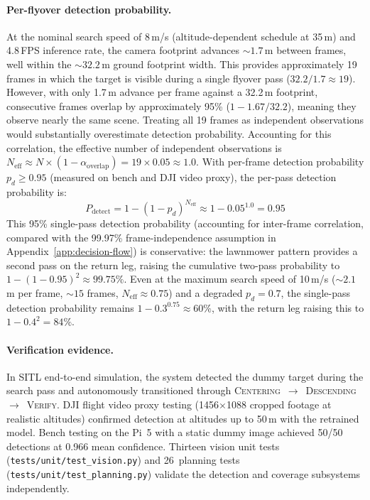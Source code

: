 \paragraph{Per-flyover detection probability.} At the nominal search speed of 8\,m/s (altitude-dependent schedule at 35\,m) and 4.8\,FPS inference rate, the camera footprint advances ${\sim}1.7$\,m between frames, well within the ${\sim}32.2$\,m ground footprint width. This provides approximately 19 frames in which the target is visible during a single flyover pass ($32.2 / 1.7 \approx 19$). However, with only 1.7\,m advance per frame against a 32.2\,m footprint, consecutive frames overlap by approximately 95\% ($1 - 1.67/32.2$), meaning they observe nearly the same scene. Treating all 19 frames as independent observations would substantially overestimate detection probability. Accounting for this correlation, the effective number of independent observations is $N_{\text{eff}} \approx N \times (1 - \alpha_{\text{overlap}}) = 19 \times 0.05 \approx 1.0$. With per-frame detection probability $p_d \geq 0.95$ (measured on bench and DJI video proxy), the per-pass detection probability is:
\[
    P_{\text{detect}} = 1 - (1 - p_d)^{N_{\text{eff}}} \approx 1 - 0.05^{1.0} = 0.95
\]
This 95\% single-pass detection probability (accounting for inter-frame correlation, compared with the 99.97\% frame-independence assumption in Appendix~\ref{app:decision-flow}) is conservative: the lawnmower pattern provides a second pass on the return leg, raising the cumulative two-pass probability to $1 - (1 - 0.95)^2 \approx 99.75\%$. Even at the maximum search speed of 10\,m/s (${\sim}2.1$\,m per frame, ${\sim}15$ frames, $N_{\text{eff}} \approx 0.75$) and a degraded $p_d = 0.7$, the single-pass detection probability remains $1 - 0.3^{0.75} \approx 60\%$, with the return leg raising this to $1 - 0.4^2 = 84\%$.

\paragraph{Verification evidence.} In SITL end-to-end simulation, the system detected the dummy target during the search pass and autonomously transitioned through \textsc{Centering}~$\rightarrow$~\textsc{Descending}~$\rightarrow$~\textsc{Verify}. DJI flight video proxy testing (1456$\times$1088 cropped footage at realistic altitudes) confirmed detection at altitudes up to 50\,m with the retrained model. Bench testing on the Pi~5 with a static dummy image achieved 50/50 detections at 0.966 mean confidence. Thirteen vision unit tests (\texttt{tests/unit/test\_vision.py}) and 26~planning tests (\texttt{tests/unit/test\_planning.py}) validate the detection and coverage subsystems independently.

